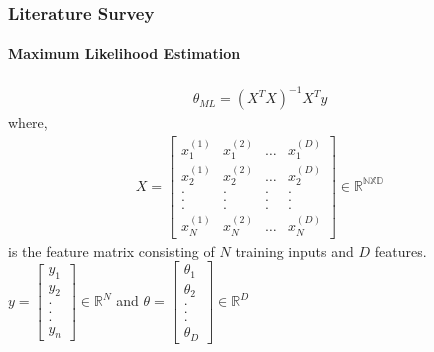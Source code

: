 \documentclass[handout,9pt]{beamer}
\numberwithin{theorem}{section}
\begin{document}
\begin{frame}
	\begin{spacing}{1}
		\frametitle{Literature Survey}
		\framesubtitle{Maximum Likelihood Estimation}
		\begin{align*}
			\boxed{\theta_{ML} = (X^TX)^{-1}X^Ty }
		\end{align*}
		where, 
		\begin{align*}
			X=\begin{bmatrix}
				x_{1}^{(1)} & x_{1}^{(2)} & \dots & x_{1}^{(D)}\\
				x_{2}^{(1)} & x_{2}^{(2)} & \dots & x_{2}^{(D)}\\
				. & . & .& .\\
				. & . & .& .\\
				. & . & .& .\\
				x_{N}^{(1)} & x_{N}^{(2)} & \dots & x_{N}^{(D)}
			\end{bmatrix} \in \mathbb{R^{NXD}}
		\end{align*}
		is the feature matrix consisting of $N$ training inputs and $D$ features.\\
		$y = \begin{bmatrix}
			y_{1}\\
			y_{2}\\
			.\\
			.\\
			.\\
			y_{n}
		\end{bmatrix} \in \mathbb{R}^N$ \hspace{2cm} and \hspace{2cm}
		$\theta = \begin{bmatrix}
			\theta_{1}\\
			\theta_{2}\\
			.\\
			.\\
			.\\
			\theta_{D}
		\end{bmatrix} \in \mathbb{R}^D$\\
	\end{spacing}
\end{frame}
\end{document}
